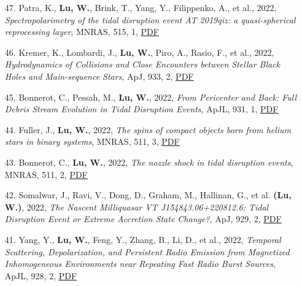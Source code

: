 \begin{itemize}[leftmargin=0.65cm]
\vspace{-0.1cm}
\item[47.]{Patra, K., {\bf Lu, W.}, Brink, T., Yang, Y., Filippenko, A., et al., 2022, {\it Spectropolarimetry of the tidal disruption event AT 2019qiz: a quasi-spherical reprocessing layer}, MNRAS, 515, 1, \href{https://ui.adsabs.harvard.edu/abs/2022MNRAS.515..138P}{\underline{PDF}}}

\vspace{-0.1cm}
\item[46.]{Kremer, K., Lombardi, J., {\bf Lu, W.}, Piro, A., Rasio, F., et al., 2022, {\it Hydrodynamics of Collisions and Close Encounters between Stellar Black Holes and Main-sequence Stars}, ApJ, 933, 2, \href{https://ui.adsabs.harvard.edu/abs/2022ApJ...933..203K}{\underline{PDF}}}

\vspace{-0.1cm}
\item[45.]{Bonnerot, C., Pessah, M., {\bf Lu, W.}, 2022, {\it From Pericenter and Back: Full Debris Stream Evolution in Tidal Disruption Events}, ApJL, 931, 1, \href{https://ui.adsabs.harvard.edu/abs/2022ApJ...931L...6B}{\underline{PDF}}}

\vspace{-0.1cm}
\item[44.]{Fuller, J., {\bf Lu, W.}, 2022, {\it The spins of compact objects born from helium stars in binary systems}, MNRAS, 511, 3, \href{https://ui.adsabs.harvard.edu/abs/2022MNRAS.511.3951F}{\underline{PDF}}}

\vspace{-0.1cm}
\item[43.]{Bonnerot, C., {\bf Lu, W.}, 2022, {\it The nozzle shock in tidal disruption events}, MNRAS, 511, 2, \href{https://ui.adsabs.harvard.edu/abs/2022MNRAS.511.2147B}{\underline{PDF}}}

\vspace{-0.1cm}
\item[42.]{Somalwar, J., Ravi, V., Dong, D., Graham, M., Hallinan, G., et al. {\bf (Lu, W.)}, 2022, {\it The Nascent Milliquasar VT J154843.06+220812.6: Tidal Disruption Event or Extreme Accretion State Change?}, ApJ, 929, 2, \href{https://ui.adsabs.harvard.edu/abs/2022ApJ...929..184S}{\underline{PDF}}}

\vspace{-0.1cm}
\item[41.]{Yang, Y., {\bf Lu, W.}, Feng, Y., Zhang, B., Li, D., et al., 2022, {\it Temporal Scattering, Depolarization, and Persistent Radio Emission from Magnetized Inhomogeneous Environments near Repeating Fast Radio Burst Sources}, ApJL, 928, 2, \href{https://ui.adsabs.harvard.edu/abs/2022ApJ...928L..16Y}{\underline{PDF}}}


\end{itemize}
